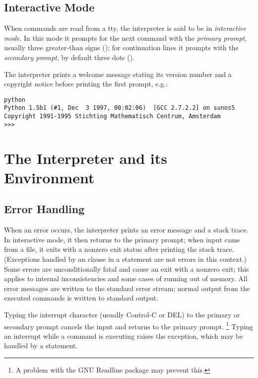 \subsection{Interactive Mode}

When commands are read from a tty, the interpreter is said to be in
\emph{interactive mode}.  In this mode it prompts for the next command
with the \emph{primary prompt}, usually three greater-than signs
(\code{>>>}); for continuation lines it prompts with the
\emph{secondary prompt},
by default three dots ().  

The interpreter prints a welcome message stating its version number
and a copyright notice before printing the first prompt, e.g.:

\bcode\begin{verbatim}
python
Python 1.5b1 (#1, Dec  3 1997, 00:02:06)  [GCC 2.7.2.2] on sunos5
Copyright 1991-1995 Stichting Mathematisch Centrum, Amsterdam
>>>
\end{verbatim}\ecode

\section{The Interpreter and its Environment}

\subsection{Error Handling}

When an error occurs, the interpreter prints an error
message and a stack trace.  In interactive mode, it then returns to
the primary prompt; when input came from a file, it exits with a
nonzero exit status after printing
the stack trace.  (Exceptions handled by an  clause in a
 statement are not errors in this context.)  Some errors are
unconditionally fatal and cause an exit with a nonzero exit; this
applies to internal inconsistencies and some cases of running out of
memory.  All error messages are written to the standard error stream;
normal output from the executed commands is written to standard
output.

Typing the interrupt character (usually Control-C or DEL) to the
primary or secondary prompt cancels the input and returns to the
primary prompt.%
\footnote{
        A problem with the GNU Readline package may prevent this.
}
Typing an interrupt while a command is executing raises the
 exception, which may be handled by a
 statement.

